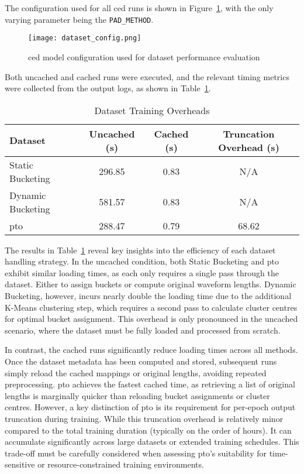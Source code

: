 The configuration used for all \gls{ced} runs is shown in Figure~\ref{fig:dataset_config}, with the only varying parameter being the \texttt{PAD\_METHOD}.

\begin{figure}[H]
    \centering
    \texttt{[image: dataset\_config.png]}
    \caption{\label{fig:dataset_config} \gls{ced} model configuration used for dataset performance evaluation}
\end{figure}

Both uncached and cached runs were executed, and the relevant timing metrics were collected from the output logs, as shown in Table~\ref{tab:dataset_loading_times}.

\vspace{1em}
\begin{table}[H]
\centering
\caption{Dataset Training Overheads}
\label{tab:dataset_loading_times}
\begin{tabular}{|l|c|c|c|}
\hline
\textbf{Dataset} & \textbf{Uncached (s)} & \textbf{Cached (s)} & \textbf{Truncation Overhead (s)} \\
\hline
Static Bucketing  & 296.85 & 0.83  & N/A    \\
Dynamic Bucketing & 581.57 & 0.83  & N/A    \\
\gls{pto}         & 288.47 & 0.79  & 68.62  \\
\hline
\end{tabular}
\end{table}

The results in Table~\ref{tab:dataset_loading_times} reveal key insights into the efficiency of each dataset handling strategy. In the uncached condition, both Static Bucketing and \gls{pto} exhibit similar loading times, as each only requires a single pass through the dataset. Either to assign buckets or compute original waveform lengths. Dynamic Bucketing, however, incurs nearly double the loading time due to the additional K-Means clustering step, which requires a second pass to calculate cluster centres for optimal bucket assignment. This overhead is only pronounced in the uncached scenario, where the dataset must be fully loaded and processed from scratch.

In contrast, the cached runs significantly reduce loading times across all methods. Once the dataset metadata has been computed and stored, subsequent runs simply reload the cached mappings or original lengths, avoiding repeated preprocessing. \gls{pto} achieves the fastest cached time, as retrieving a list of original lengths is marginally quicker than reloading bucket assignments or cluster centres. However, a key distinction of \gls{pto} is its requirement for per-epoch output truncation during training. While this truncation overhead is relatively minor compared to the total training duration (typically on the order of hours). It can accumulate significantly across large datasets or extended training schedules. This trade-off must be carefully considered when assessing \gls{pto}'s suitability for time-sensitive or resource-constrained training environments.

